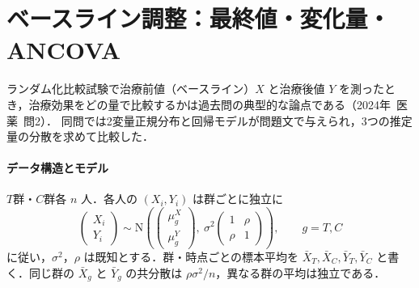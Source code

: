 \documentclass[a4paper,11pt,openany]{ltjsbook}
\newcommand{\tagbox}[2]{\tcbox[on line,boxsep=0.5pt,left=2pt,right=2pt,top=0.5pt,bottom=0.5pt,
  colframe=#1,colback=#1!10,boxrule=0.4pt,arc=1pt]{\scriptsize\bfseries\textcolor{#1}{#2}}}
\newcommand{\Hinshutsu}{\tagbox{bkorange}{頻出}}
\newcommand{\kakomon}[2]{\mbox{#1年 医薬 問#2}}
\newcommand{\Normal}{\mathrm{N}}
\begin{document}
\section{ベースライン調整：最終値・変化量・ANCOVA}\label{sec:08-ancova}
\Hinshutsu
ランダム化比較試験で治療前値（ベースライン）$X$ と治療後値 $Y$ を測ったとき，治療効果をどの量で比較するかは過去問の典型的な論点である（\kakomon{2024}{2}）．
同問では2変量正規分布と回帰モデルが問題文で与えられ，3つの推定量の分散を求めて比較した．

\paragraph{データ構造とモデル}
$T$群・$C$群各 $n$ 人．各人の $(X_i,Y_i)$ は群ごとに独立に
\[
\begin{pmatrix}X_i\\Y_i\end{pmatrix}\sim\Normal\left(\begin{pmatrix}\mu_g^X\\\mu_g^Y\end{pmatrix},\ \sigma^2\begin{pmatrix}1&\rho\\\rho&1\end{pmatrix}\right),\qquad g=T,C
\]
に従い，$\sigma^2$，$\rho$ は既知とする．群・時点ごとの標本平均を $\bar X_T,\bar X_C,\bar Y_T,\bar Y_C$ と書く．同じ群の $\bar X_g$ と $\bar Y_g$ の共分散は $\rho\sigma^2/n$，異なる群の平均は独立である．
\end{document}
